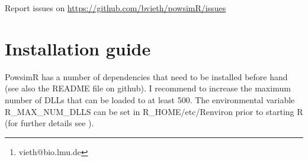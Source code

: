 \documentclass{article}\usepackage[]{graphicx}\usepackage[usenames,dvipsnames]{color}
\author{Beate Vieth \footnote{vieth@bio.lmu.de}}
\begin{document}
\maketitle


Report issues on \url{https://github.com/bvieth/powsimR/issues}

\newpage

\tableofcontents



\newpage

\section{Installation guide}

PowsimR has a number of dependencies that need to be installed before hand (see also the README file on github). I recommend to increase the maximum number of DLLs that can be loaded to at least 500. The environmental variable R\_MAX\_NUM\_DLLS can be set in R\_HOME/etc/Renviron prior to starting R (for further details see ).
\end{document}

